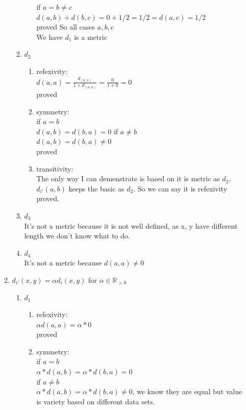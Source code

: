 \documentclass{article}
\begin{document}
\begin{enumerate}
\begin{enumerate}
\begin{enumerate}
\begin{enumerate}
		if $a = b \neq c$\\
		$d(a,b)  + d(b, c) = 0 + 1/2 = 1/2 = d(a,c) = 1/2$\\
		proved
		So all cases $a,b,c$\\
		We have $d_1$ is a metric \\
	\end{enumerate}
	\item $d_2$\\
	\begin{enumerate}
		\item refexivity:\\
		$d(a,a) = \frac{d_(a,a)}{1 + d_(a,a)} = \frac{0}{1+0} = 0$\\
		proved
		\item symmetry: \\
		if $a = b$\\
		$d(a,b) = d(b,a) = 0$
		if $a\neq b$\\
		$d(a,b) = d(b,a) \neq 0$\\
		proved
		\item transitivity:\\
		The only way I can demenstrate is based on it is metric as $d_2$, $d_{i'}(a,b)$ keeps the basic as $d_2$. So we can say it is refexivity proved.\\
	\end{enumerate}
	\item $d_3$\\
		It's not a metric because it is not well defined, as x, y have different length we don't know what to do.
	\item $d_4$\\
		It's not a metric because $d(a,a) \neq 0$
\end{enumerate}
\item $d_{i'}(x,y) = \alpha d_i(x,y)$ for $\alpha\in\mathbb{R}_{>0}$\\
\begin{enumerate}
	\item $d_1$
	\begin{enumerate}
		\item refexivity:\\
		$\alpha d(a,a) = \alpha * 0 $\\
		proved
		\item symmetry: \\
		if $a = b$\\
		$\alpha * d(a,b) = \alpha * d(b,a) = 0$\\
		if $a\neq b$\\
		$\alpha * d(a,b) = \alpha * d(b,a) \neq 0$, we know they are equal but value is variety based on different data sets.\\

\end{enumerate}
\end{enumerate}
\end{enumerate}
\end{enumerate}
\end{document}
